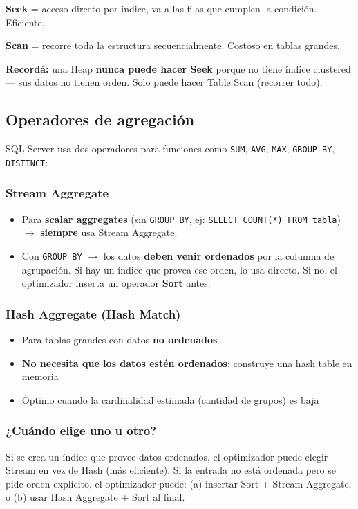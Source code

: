 \documentclass[11pt, a4paper]{article}
\begin{document}
\vspace{0.5em}
\textbf{Seek} = acceso directo por índice, va a las filas que cumplen la condición. Eficiente.

\textbf{Scan} = recorre toda la estructura secuencialmente. Costoso en tablas grandes.

\begin{recallbox}
	\textbf{Recordá:} una Heap \textbf{nunca puede hacer Seek} porque no tiene índice clustered --- sus datos no tienen orden. Solo puede hacer Table Scan (recorrer todo).
\end{recallbox}

\subsection{Operadores de agregación}

SQL Server usa dos operadores para funciones como \texttt{SUM}, \texttt{AVG}, \texttt{MAX}, \texttt{GROUP BY}, \texttt{DISTINCT}:

\subsubsection{Stream Aggregate}
\begin{itemize}
	\item Para \textbf{scalar aggregates} (sin \texttt{GROUP BY}, ej: \texttt{SELECT COUNT(*) FROM tabla}) $\to$ \textbf{siempre} usa Stream Aggregate.
	\item Con \texttt{GROUP BY} $\to$ los datos \textbf{deben venir ordenados} por la columna de agrupación. Si hay un índice que provea ese orden, lo usa directo. Si no, el optimizador inserta un operador \textbf{Sort} antes.
\end{itemize}

\subsubsection{Hash Aggregate (Hash Match)}
\begin{itemize}
	\item Para tablas grandes con datos \textbf{no ordenados}
	\item \textbf{No necesita que los datos estén ordenados}: construye una hash table en memoria
	\item Óptimo cuando la cardinalidad estimada (cantidad de grupos) es baja
\end{itemize}

\subsubsection{¿Cuándo elige uno u otro?}
Si se crea un índice que provee datos ordenados, el optimizador puede elegir Stream en vez de Hash (más eficiente). Si la entrada no está ordenada pero se pide orden explícito, el optimizador puede: (a) insertar Sort + Stream Aggregate, o (b) usar Hash Aggregate + Sort al final.
\end{document}
